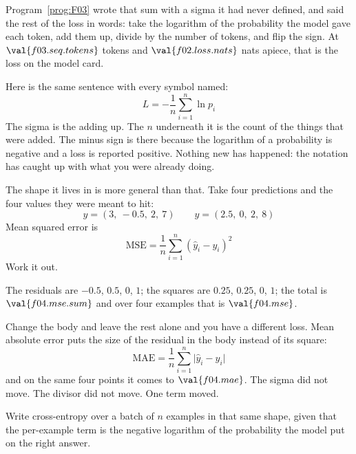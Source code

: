 \begin{fr}
Program~\ref{prog:F03} wrote that sum with a sigma it had never defined, and
said the rest of the loss in words: take the logarithm of the probability the
model gave each token, add them up, divide by the number of tokens, and flip
the sign. At $\val{f03.seq.tokens}$ tokens and $\val{f02.loss.nats}$ nats apiece,
that is the loss on the model card.

Here is the same sentence with every symbol named:
\[ L = -\frac{1}{n}\sum_{i=1}^{n} \ln p_i \]
The sigma is the adding up. The $n$ underneath it is the count of the things
that were added. The minus sign is there because the logarithm of a
probability is negative and a loss is reported positive. Nothing new has
happened: the notation has caught up with what you were already doing.

The shape it lives in is more general than that. Take four predictions and the
four values they were meant to hit:
\[ y = (3,\ -\num{0.5},\ 2,\ 7) \qquad
   \hat{y} = (\num{2.5},\ 0,\ 2,\ 8) \]
Mean squared error is
\[ \mathrm{MSE} = \frac{1}{n}\sum_{i=1}^{n} (\hat{y}_i - y_i)^{2} \]
Work it out.
\nextframe
\end{fr}

\begin{fr}
\begin{ansblock}
The residuals are $-\num{0.5}$, $\num{0.5}$, $0$, $1$; the squares are
$\num{0.25}$, $\num{0.25}$, $0$, $1$; the total is $\val{f04.mse.sum}$ and
over four examples that is $\val{f04.mse}$.
\end{ansblock}

Change the body and leave the rest alone and you have a different loss. Mean
absolute error puts the size of the residual in the body instead of its
square:
\[ \mathrm{MAE} = \frac{1}{n}\sum_{i=1}^{n} \lvert \hat{y}_i - y_i \rvert \]
and on the same four points it comes to $\val{f04.mae}$. The sigma did not
move. The divisor did not move. One term moved.

\yourturn
Write cross-entropy over a batch of $n$ examples in that same shape, given
that the per-example term is the negative logarithm of the probability the
model put on the right answer.
\dotline
\nextframe
\end{fr}

